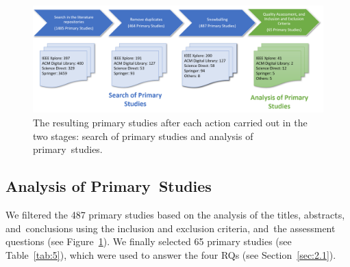 \documentclass[sensors,review,accept,moreauthors,pdftex]{Definitions/mdpi}
\begin{document}
\begin{figure}[H]
	\centering
	\includegraphics[width=.95\linewidth]{ResearchProcess1}
	\caption{The resulting primary studies after each action carried out in the two stages: search of primary studies and analysis of primary~studies.}
	\label{fig:1}

\end{figure}
\unskip

\subsection{Analysis of Primary~Studies} \label{sec:2.3}

We filtered the 487 primary studies based on the analysis of the titles, abstracts, and~conclusions using the inclusion and exclusion criteria, and~the assessment questions (see Figure~\ref{fig:1}). We finally selected 65 primary studies (see Table~\ref{tab:5}), which were used to answer the four RQs (see Section~\ref{sec:2.1}).
\end{document}
